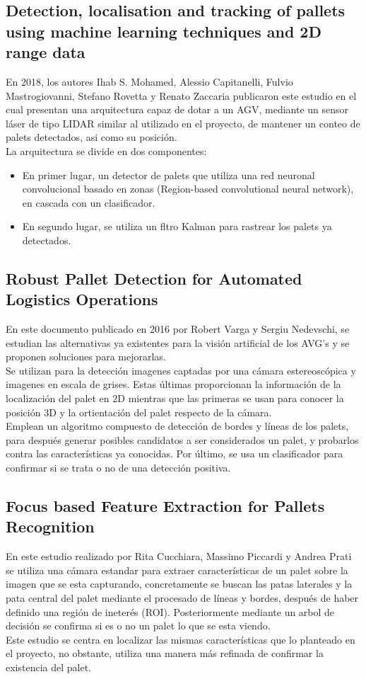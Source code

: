 \subsection{Detection, localisation and tracking of pallets using machine learning techniques and 2D range data \cite{art18:machinelearning}}
En 2018, los autores Ihab S. Mohamed, Alessio Capitanelli, Fulvio Mastrogiovanni, Stefano Rovetta y Renato Zaccaria publicaron este estudio en el cual presentan una arquitectura capaz de dotar a un AGV, mediante un sensor láser de tipo LIDAR similar al utilizado en el proyecto, de mantener un conteo de palets detectados, asi como su posición.\\
La arquitectura se divide en dos componentes:
\begin{itemize}
\item En primer lugar, un detector de palets que utiliza una red neuronal convolucional basado en zonas (Region-based convolutional neural network), en cascada con un clasificador.
\item En segundo lugar, se utiliza un fltro Kalman para rastrear los palets ya detectados.
\end{itemize}

\subsection{Robust Pallet Detection for Automated Logistics Operations \cite{art17:carganedevschi}}
En este documento publicado en 2016 por Robert Varga y Sergiu Nedevschi, se estudian las alternativas ya existentes para la visión artificial de los AVG's y se proponen soluciones para mejorarlas.\\
Se utilizan para la detección imagenes captadas por una cámara estereoscópica y imagenes en escala de grises. Estas últimas proporcionan la información de la localización del palet en 2D mientras que las primeras se usan para conocer la posición 3D y la ortientación del palet respecto de la cámara.\\
Emplean un algoritmo compuesto de detección de bordes y líneas de los palets, para después generar posibles candidatos a ser considerados un palet, y probarlos contra las características ya conocidas. Por último, se usa un clasificador para confirmar si se trata o no de una detección positiva.

\subsection{Focus based Feature Extraction for Pallets Recognition \cite{art14:Cucchiara2000FocusBF}}
En este estudio realizado por Rita Cucchiara, Massimo Piccardi y Andrea Prati se utiliza una cámara estandar para extraer características de un palet sobre la imagen que se esta capturando, concretamente se buscan las patas laterales y la pata central del palet mediante el procesado de líneas y bordes, después de haber definido una región de ineterés (ROI). Posteriormente mediante un arbol de decisión se confirma si es o no un palet lo que se esta viendo.\\ Este estudio se centra en localizar las mismas características que lo planteado en el proyecto, no obstante, utiliza una manera más refinada de confirmar la existencia del palet.

